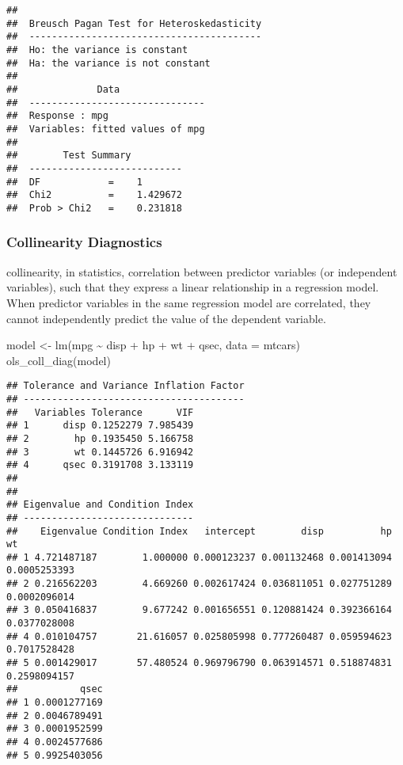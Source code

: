 \documentclass[
]{article}
\newenvironment{Shaded}{\begin{snugshade}}{\end{snugshade}}
\newcommand{\AttributeTok}[1]{\textcolor[rgb]{0.77,0.63,0.00}{#1}}
\newcommand{\FunctionTok}[1]{\textcolor[rgb]{0.00,0.00,0.00}{#1}}
\newcommand{\NormalTok}[1]{#1}
\newcommand{\OtherTok}[1]{\textcolor[rgb]{0.56,0.35,0.01}{#1}}
\newcommand{\SpecialCharTok}[1]{\textcolor[rgb]{0.00,0.00,0.00}{#1}}
\begin{document}
\begin{verbatim}
## 
##  Breusch Pagan Test for Heteroskedasticity
##  -----------------------------------------
##  Ho: the variance is constant            
##  Ha: the variance is not constant        
## 
##              Data               
##  -------------------------------
##  Response : mpg 
##  Variables: fitted values of mpg 
## 
##        Test Summary         
##  ---------------------------
##  DF            =    1 
##  Chi2          =    1.429672 
##  Prob > Chi2   =    0.231818
\end{verbatim}

\hypertarget{collinearity-diagnostics}{%
\subsubsection{Collinearity
Diagnostics}\label{collinearity-diagnostics}}

collinearity, in statistics, correlation between predictor variables (or
independent variables), such that they express a linear relationship in
a regression model. When predictor variables in the same regression
model are correlated, they cannot independently predict the value of the
dependent variable.

\begin{Shaded}
\begin{Highlighting}[]
\NormalTok{model }\OtherTok{\textless{}{-}} \FunctionTok{lm}\NormalTok{(mpg }\SpecialCharTok{\textasciitilde{}}\NormalTok{ disp }\SpecialCharTok{+}\NormalTok{ hp }\SpecialCharTok{+}\NormalTok{ wt }\SpecialCharTok{+}\NormalTok{ qsec, }\AttributeTok{data =}\NormalTok{ mtcars)}
\FunctionTok{ols\_coll\_diag}\NormalTok{(model)}
\end{Highlighting}
\end{Shaded}

\begin{verbatim}
## Tolerance and Variance Inflation Factor
## ---------------------------------------
##   Variables Tolerance      VIF
## 1      disp 0.1252279 7.985439
## 2        hp 0.1935450 5.166758
## 3        wt 0.1445726 6.916942
## 4      qsec 0.3191708 3.133119
## 
## 
## Eigenvalue and Condition Index
## ------------------------------
##    Eigenvalue Condition Index   intercept        disp          hp           wt
## 1 4.721487187        1.000000 0.000123237 0.001132468 0.001413094 0.0005253393
## 2 0.216562203        4.669260 0.002617424 0.036811051 0.027751289 0.0002096014
## 3 0.050416837        9.677242 0.001656551 0.120881424 0.392366164 0.0377028008
## 4 0.010104757       21.616057 0.025805998 0.777260487 0.059594623 0.7017528428
## 5 0.001429017       57.480524 0.969796790 0.063914571 0.518874831 0.2598094157
##           qsec
## 1 0.0001277169
## 2 0.0046789491
## 3 0.0001952599
## 4 0.0024577686
## 5 0.9925403056
\end{verbatim}
\end{document}
